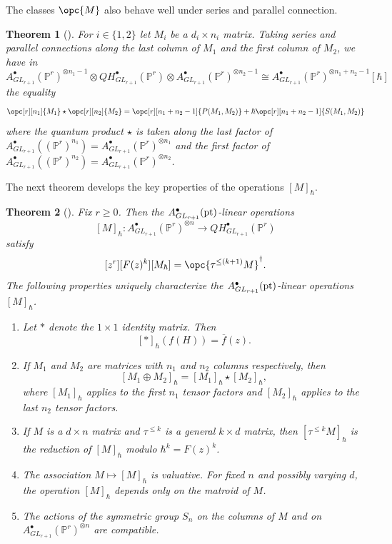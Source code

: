 \documentclass[12pt]{amsart}
\newcommand{\mb}{\mathbb}
\newcommand{\pt}{{\rm pt}}
\theoremstyle{plain}
\newtheorem{Thm*}{Theorem}
\theoremstyle{definition}
\theoremstyle{remark}
\begin{document}
The classes $\opc{M}$ also behave well under series and parallel connection.

\begin{Thm*}[]\label{serparintro}
For $i \in \{1,2\}$ let $M_i$ be a $d_i \times n_i$ matrix. Taking series and parallel connections along the last column of $M_1$ and the first column of $M_2$, we have in $A^\bullet_{GL_{r+1}}(\mb{P}^r)^{\otimes n_1-1}\otimes QH^\bullet_{GL_{r+1}}(\mb{P}^r)\otimes A^\bullet_{GL_{r+1}}(\mb{P}^r)^{\otimes n_2-1}\cong A^\bullet_{GL_{r+1}}(\mb{P}^r)^{\otimes n_1+n_2-1}[\hbar]$ the equality $$\opc[r][n_1]{M_1} \star \opc[r][n_2]{M_2}=\opc[r][n_1+n_2-1]{P(M_1,M_2)}+\hbar\opc[r][n_1+n_2-1]{S(M_1,M_2)}$$ where the quantum product $\star$ is taken along the last factor of $A^\bullet_{GL_{r+1}} ((\mb{P}^r)^{n_1}) = A^\bullet_{GL_{r+1}} (\mb{P}^r)^{\otimes n_1}$ and the first factor of $A^\bullet_{GL_{r+1}} ((\mb{P}^r)^{n_2}) = A^\bullet_{GL_{r+1}} (\mb{P}^r)^{\otimes n_2}$.
\end{Thm*}

The next theorem develops the key properties of the operations $[M]_\hbar$.

\begin{Thm*}[]\label{Mhbarintro}
Fix $r \ge 0$. Then the $A^\bullet_{GL_{r+1}}(\pt)$-linear operations $$[M]_{\hbar}:A^\bullet_{GL_{r+1}}(\mb{P}^r)^{\otimes n}\to QH^\bullet_{GL_{r+1}}(\mb{P}^r)$$ satisfy
$$[z^r][F(z)^k][M_{\hbar}]=\opc{\tau^{\le (k+1)}M}^{\dagger}.$$
The following properties uniquely characterize the $A^\bullet_{GL_{r+1}}(\pt)$-linear operations $[M]_{\hbar}$.
\begin{enumerate}
    \item Let $\ast$ denote the $1 \times 1$ identity matrix. Then $$[\ast]_\hbar(f(H))=\overline{f}(z).$$
    \item If $M_1$ and $M_2$ are matrices with $n_1$ and $n_2$ columns respectively, then $$[M_1 \oplus M_2]_\hbar = [M_1]_\hbar \star [M_2]_\hbar,$$ where $[M_1]_\hbar$ applies to the first $n_1$ tensor factors and $[M_2]_\hbar$ applies to the last $n_2$ tensor factors.
    \item If $M$ is a $d \times n$ matrix and $\tau^{\leq k}$ is a general $k \times d$ matrix, then $[\tau^{\leq k} M]_\hbar$ is the reduction of $[M]_\hbar$ modulo $\hbar^k=F(z)^k$.
    \item The association $M \mapsto [M]_{\hbar}$ is valuative. For fixed $n$ and possibly varying $d$, the operation $[M]_{\hbar}$ depends only on the matroid of $M$.
    \item The actions of the symmetric group $S_n$ on the columns of $M$ and on $A^\bullet_{GL_{r+1}}(\mb{P}^r)^{\otimes n}$ are compatible.
\end{enumerate}
\end{Thm*}
\end{document}

